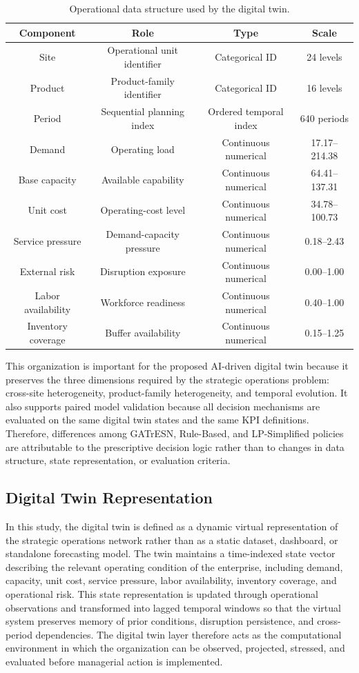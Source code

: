 \documentclass[apajournal,article,submit,pdftex,moreauthors]{Definitions/mdpi}
\begin{document}
\begin{table}[H]
\caption{Operational data structure used by the digital twin.\label{tab:data_structure}}
\begin{tabularx}{\textwidth}{CCCC}
\toprule
\textbf{Component} & \textbf{Role} & \textbf{Type} & \textbf{Scale}\\
\midrule
Site & Operational unit identifier & Categorical ID & 24 levels\\
Product & Product-family identifier & Categorical ID & 16 levels\\
Period & Sequential planning index & Ordered temporal index & 640 periods\\
Demand & Operating load & Continuous numerical & 17.17--214.38\\
Base capacity & Available capability & Continuous numerical & 64.41--137.31\\
Unit cost & Operating-cost level & Continuous numerical & 34.78--100.73\\
Service pressure & Demand-capacity pressure & Continuous numerical & 0.18--2.43\\
External risk & Disruption exposure & Continuous numerical & 0.00--1.00\\
Labor availability & Workforce readiness & Continuous numerical & 0.40--1.00\\
Inventory coverage & Buffer availability & Continuous numerical & 0.15--1.25\\
\bottomrule
\end{tabularx}
\end{table}

This organization is important for the proposed AI-driven digital twin because it preserves the three dimensions required by the strategic operations problem: cross-site heterogeneity, product-family heterogeneity, and temporal evolution. It also supports paired model validation because all decision mechanisms are evaluated on the same digital twin states and the same KPI definitions. Therefore, differences among GATrESN, Rule-Based, and LP-Simplified policies are attributable to the prescriptive decision logic rather than to changes in data structure, state representation, or evaluation criteria.

\subsection{Digital Twin Representation}
In this study, the digital twin is defined as a dynamic virtual representation of the strategic operations network rather than as a static dataset, dashboard, or standalone forecasting model. The twin maintains a time-indexed state vector describing the relevant operating condition of the enterprise, including demand, capacity, unit cost, service pressure, labor availability, inventory coverage, and operational risk. This state representation is updated through operational observations and transformed into lagged temporal windows so that the virtual system preserves memory of prior conditions, disruption persistence, and cross-period dependencies. The digital twin layer therefore acts as the computational environment in which the organization can be observed, projected, stressed, and evaluated before managerial action is implemented.
\end{document}
